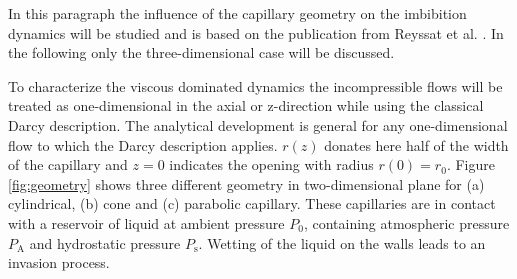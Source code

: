 \documentclass[aip, amsmath, amssymb, reprint, twocolumn, floatfix]{revtex4-1}
\newcommand{\Pa}{P_\mathrm{A}}
\newcommand{\Ps}{P_\mathrm{s}}
\begin{document}
In this paragraph the influence of the capillary geometry on the imbibition dynamics will be studied and is based on the publication from Reyssat et al. \cite{Reyssat2008}. In the following only the three-dimensional case will be discussed.
\bigskip

To characterize the viscous dominated dynamics the incompressible flows will be treated as one-dimensional in the axial or z-direction while using the classical Darcy description. The analytical development is general for any one-dimensional flow to which the Darcy description applies. $r(z)$ donates here half of the width of the capillary and $z = 0$ indicates the opening with radius $r(0) = r_0$. Figure \ref{fig:geometry} shows three different geometry in two-dimensional plane for (a) cylindrical, (b) cone and (c) parabolic capillary. These capillaries are in contact with a reservoir of liquid at ambient pressure $P_0$, containing atmospheric pressure $\Pa$ and hydrostatic pressure $\Ps$. Wetting of the liquid on the walls leads to an invasion process.

\begin{center}
	\captionsetup{type=figure}
	
	\label{fig:geometry}
\end{center}
\end{document}

